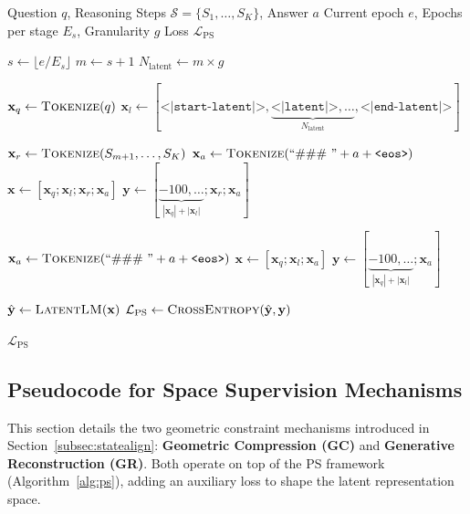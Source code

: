\begin{algorithm}[h]
\footnotesize
\caption{Trajectory Supervision with Progressive Schedule (PS-LATENT)}
\label{alg:ps}
\begin{algorithmic}[1]
 Question $q$, Reasoning Steps $\mathcal{S} = \{S_1, \ldots, S_K\}$, Answer $a$
 Current epoch $e$, Epochs per stage $E_s$, Granularity $g$
 Loss $\mathcal{L}_{\text{PS}}$

\STATE $s \gets \lfloor e / E_s \rfloor$ 
\STATE $m \gets s + 1$ 
\STATE $N_{\text{latent}} \gets m \times g$ 

\STATE $\mathbf{x}_q \gets \textsc{Tokenize}(q)$
\STATE $\mathbf{x}_l \gets [\texttt{<|start-latent|>}, \underbrace{\texttt{<|latent|>}, \ldots}_{N_{\text{latent}}}, \texttt{<|end-latent|>}]$

    \STATE $\mathbf{x}_r \gets \textsc{Tokenize}(S_{m+1}, \ldots, S_K)$ 
    \STATE $\mathbf{x}_a \gets \textsc{Tokenize}(\text{``\#\#\# ''} + a + \texttt{<eos>})$
    \STATE $\mathbf{x} \gets [\mathbf{x}_q; \mathbf{x}_l; \mathbf{x}_r; \mathbf{x}_a]$
    \STATE $\mathbf{y} \gets [\underbrace{-100, \ldots}_{|\mathbf{x}_q| + |\mathbf{x}_l|}; \mathbf{x}_r; \mathbf{x}_a]$

\ELSE 
    \STATE $\mathbf{x}_a \gets \textsc{Tokenize}(\text{``\#\#\# ''} + a + \texttt{<eos>})$
    \STATE $\mathbf{x} \gets [\mathbf{x}_q; \mathbf{x}_l; \mathbf{x}_a]$
    \STATE $\mathbf{y} \gets [\underbrace{-100, \ldots}_{|\mathbf{x}_q| + |\mathbf{x}_l|}; \mathbf{x}_a]$
\ENDIF

\STATE
\STATE $\hat{\mathbf{y}} \gets \textsc{LatentLM}(\mathbf{x})$
\STATE $\mathcal{L}_{\text{PS}} \gets \textsc{CrossEntropy}(\hat{\mathbf{y}}, \mathbf{y})$

 $\mathcal{L}_{\text{PS}}$
\end{algorithmic}
\end{algorithm}

\subsection{Pseudocode for Space Supervision Mechanisms}
\label{app:state_alignment_pseudocode}

This section details the two geometric constraint mechanisms introduced in Section~\ref{subsec:statealign}: \textbf{Geometric Compression (GC)} and \textbf{Generative Reconstruction (GR)}. Both operate on top of the PS framework (Algorithm~\ref{alg:ps}), adding an auxiliary loss to shape the latent representation space.

